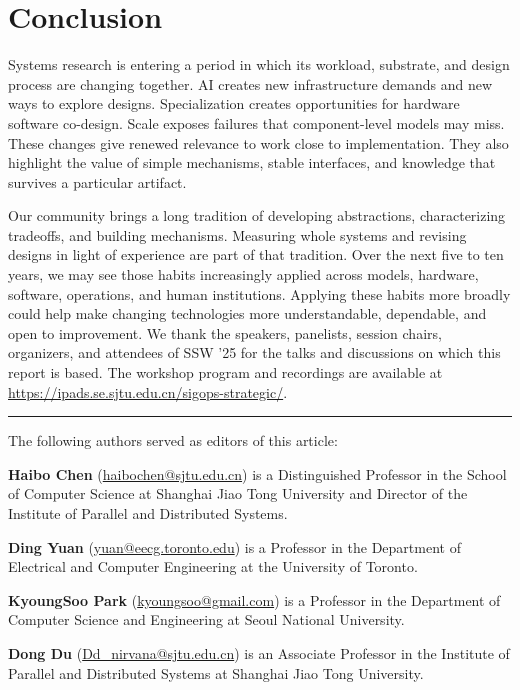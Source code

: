 \documentclass[manuscript]{acmart}
\begin{document}
\section{Conclusion}

Systems research is entering a period in which its workload, substrate, and design process are changing together.
AI creates new infrastructure demands and new ways to explore designs.
Specialization creates opportunities for hardware software co-design.
Scale exposes failures that component-level models may miss.
These changes give renewed relevance to work close to implementation.
They also highlight the value of simple mechanisms, stable interfaces, and knowledge that survives a particular artifact.

Our community brings a long tradition of developing abstractions, characterizing tradeoffs, and building mechanisms.
Measuring whole systems and revising designs in light of experience are part of that tradition.
Over the next five to ten years, we may see those habits increasingly applied across models, hardware, software, operations, and human institutions.
Applying these habits more broadly could help make changing technologies more understandable, dependable, and open to improvement.
We thank the speakers, panelists, session chairs, organizers, and attendees of SSW '25 for the talks and discussions on which this report is based.
The workshop program and recordings are available at \url{https://ipads.se.sjtu.edu.cn/sigops-strategic/}.

\nocite{10.1145/775323.775329}
\nocite{10.1145/775260.775263}
\nocite{10.1145/346152.346162}
\nocite{10.1145/2209249.2209272}
\nocite{10.1145/773379.806614}
\nocite{10.1145/2408776.2408794}
\nocite{lampson2021hintsprinciplescomputerdesign}



\par
\noindent\rule{\linewidth}{0.4pt}
\par
\noindent The following authors served as editors of this article:

\par
\noindent\textbf{Haibo Chen} (\href{mailto:haibochen@sjtu.edu.cn}{haibochen@sjtu.edu.cn})
is a Distinguished Professor in the School of Computer Science at Shanghai Jiao
Tong University and Director of the Institute of Parallel and Distributed
Systems.

\par
\noindent\textbf{Ding Yuan} (\href{mailto:yuan@eecg.toronto.edu}{yuan@eecg.toronto.edu})
is a Professor in the Department of Electrical and Computer Engineering at the
University of Toronto.

\par
\noindent\textbf{KyoungSoo Park} (\href{mailto:kyoungsoo@gmail.com}{kyoungsoo@gmail.com})
is a Professor in the Department of Computer Science and Engineering at Seoul
National University.

\par
\noindent\textbf{Dong Du} (\href{mailto:Dd_nirvana@sjtu.edu.cn}{Dd\_nirvana@sjtu.edu.cn})
is an Associate Professor in the Institute of Parallel and Distributed Systems
at Shanghai Jiao Tong University.
\end{document}
